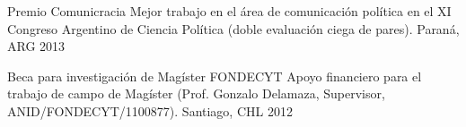 
\begin{cvhonors}
\cvhonor
{Premio Comunicracia}
{Mejor trabajo en el área de comunicación política en el XI Congreso Argentino de Ciencia Política (doble evaluación ciega de pares).} %
{Paraná, ARG}
{2013}
\end{cvhonors}

\vspace{1mm}


\vspace{1mm}

\begin{cvhonors}
\cvhonor
{Beca para investigación de Magíster FONDECYT}
{Apoyo financiero para el trabajo de campo de Magíster (Prof. Gonzalo Delamaza, Supervisor, ANID/FONDECYT/1100877).} %
{Santiago, CHL}
{2012}
\end{cvhonors}

\pagebreak
